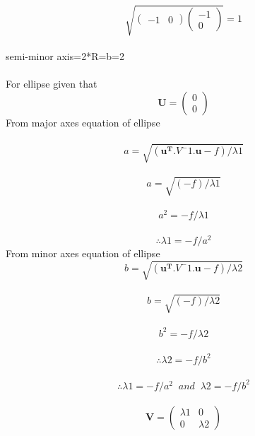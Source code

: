\documentclass[10pt, a4paper]{article}
\newcommand{\myvec}[1]{\ensuremath{\begin{pmatrix}#1\end{pmatrix}}}
\let\vec\mathbf
\begin{document}
\begin{equation}                                                                                   \sqrt{\myvec{-1 &0}\myvec{-1\\0}} =1                                     
\end{equation}\\
semi-minor axis=2*R=b=2\\\\
For ellipse
given that
\begin{equation}
\vec{U}=\myvec{0\\0}
\end{equation} 
From major axes equation of ellipse\\\\
\begin{equation}
a=\sqrt{(\vec{u^T}.V^-1.\vec{u}-f)/\lambda1}
\end{equation}\\
\begin{equation}
a=\sqrt{(-f)/\lambda1}
\end{equation}\\
\begin{equation}
a^2=-f/\lambda1
\end{equation}\\
\begin{equation}
\therefore \lambda1=-f/a^2
\end{equation}
From minor axes equation of ellipse\\
\begin{equation}
b=\sqrt{(\vec{u^T}.V^-1.\vec{u}-f)/\lambda2}
\end{equation}\\
\begin{equation}
b=\sqrt{(-f)/\lambda2}
\end{equation}\\
\begin{equation}
b^2=-f/\lambda2
\end{equation}\\
\begin{equation}
\therefore \lambda2=-f/b^2
\end{equation}\\
\begin{equation}
\therefore\lambda1=-f/a^2 \;\;and\;\;\lambda2=-f/b^2
\end{equation}\\
\begin{equation}
\vec{V}=\myvec{\lambda1&0\\0&\lambda2}
\end{equation}\\
\end{document}
